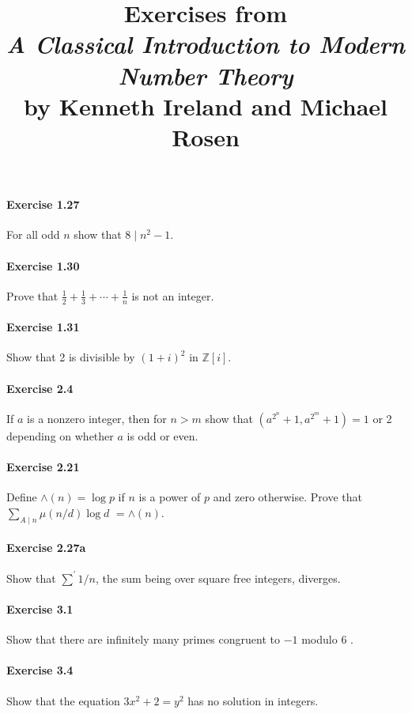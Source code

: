 \documentclass{article}
\title{\textbf{
Exercises from \\
\textit{A Classical Introduction to Modern Number Theory} \\
by Kenneth Ireland and Michael Rosen
}}
\date{}
\begin{document}
\maketitle

\paragraph{Exercise 1.27} For all odd $n$ show that $8 \mid n^{2}-1$.

\paragraph{Exercise 1.30} Prove that $\frac{1}{2}+\frac{1}{3}+\cdots+\frac{1}{n}$ is not an integer.

\paragraph{Exercise 1.31} Show that 2 is divisible by $(1+i)^{2}$ in $\mathbb{Z}[i]$.

\paragraph{Exercise 2.4} If $a$ is a nonzero integer, then for $n>m$ show that $\left(a^{2^{n}}+1, a^{2^{m}}+1\right)=1$ or 2 depending on whether $a$ is odd or even.

\paragraph{Exercise 2.21} Define $\wedge(n)=\log p$ if $n$ is a power of $p$ and zero otherwise. Prove that $\sum_{A \mid n} \mu(n / d) \log d$ $=\wedge(n)$.

\paragraph{Exercise 2.27a} Show that $\sum^{\prime} 1 / n$, the sum being over square free integers, diverges.

\paragraph{Exercise 3.1} Show that there are infinitely many primes congruent to $-1$ modulo 6 .

\paragraph{Exercise 3.4} Show that the equation $3 x^{2}+2=y^{2}$ has no solution in integers.
\end{document}
